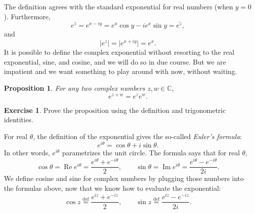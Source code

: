 \documentclass[12pt,openany]{book}
\renewcommand{\Re}{\operatorname{Re}}
\renewcommand{\Im}{\operatorname{Im}}
\newcommand{\sabs}[1]{\lvert {#1} \rvert}
\newcommand{\C}{{\mathbb{C}}}
\newcommand{\myindex}[1]{#1\index{#1}}
\theoremstyle{plain}
\newtheorem{prop}[thm]{Proposition}
\theoremstyle{remark}
\theoremstyle{definition}
\newenvironment{exbox}{%
    \def\FrameCommand{\vrule width 1pt \relax\hspace{10pt}}%
    \MakeFramed{\advance\hsize-\width\FrameRestore}%
}{%
    \endMakeFramed
}
\theoremstyle{exercise}
\newtheorem{exercise}{Exercise}[section]
\theoremstyle{example}
\begin{document}
The definition agrees with the standard exponential for real numbers (when
$y=0$).  Furthermore,
\begin{equation*}
e^{\bar{z}} = 
e^{x-iy} =
e^x\cos y - i e^x \sin y  = \overline{e^{z}} ,
\end{equation*}
and
\begin{equation*}
\sabs{e^{z}} = 
\sabs{e^{x+iy}} =
e^x .
\end{equation*}
It is possible to define the complex exponential without resorting to
the real exponential, sine, and cosine, and we will do so in due course.
But we are impatient and we want something to play around with now, without waiting.

\begin{prop}
For any two complex numbers $z,w \in \C$,
\begin{equation*}
e^{z+w} = e^z e^w .
\end{equation*}
\end{prop}

\begin{exbox}
\begin{exercise}%
Prove the proposition using the definition and trigonometric identities.
\end{exercise}
\end{exbox}

For real $\theta$, the definition
of the exponential gives the so-called
\emph{\myindex{Euler's formula}}:
\begin{equation*}
e^{i\theta}
=
\cos \theta + i \sin \theta .
\end{equation*}
In other words, $e^{i \theta}$ parametrizes the unit circle.
The formula says that for real $\theta$,
\begin{equation*}
\cos \theta = \Re e^{i\theta} = \frac{e^{i\theta}+e^{-i\theta}}{2} ,
\qquad
\sin \theta = \Im e^{i\theta} = \frac{e^{i\theta}-e^{-i\theta}}{2i} .
\end{equation*}
We define cosine and sine for complex numbers by plugging
those numbers
into the formulas above, now that we know how to evaluate the exponential:
\begin{equation*}
\cos z \overset{\text{def}}{=} \frac{e^{iz}+e^{-iz}}{2} ,
\qquad
\sin z \overset{\text{def}}{=} \frac{e^{iz}-e^{-iz}}{2i} .
\end{equation*}
\end{document}
